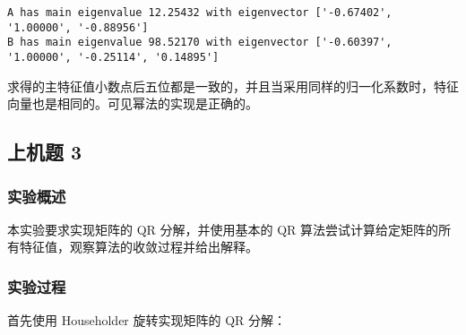 \documentclass[11pt]{ctexart}
\begin{document}
    \begin{Verbatim}[commandchars=\\\{\}]
A has main eigenvalue 12.25432 with eigenvector ['-0.67402', '1.00000', '-0.88956']
B has main eigenvalue 98.52170 with eigenvector ['-0.60397', '1.00000', '-0.25114', '0.14895']

    \end{Verbatim}

    求得的主特征值小数点后五位都是一致的，并且当采用同样的归一化系数时，特征向量也是相同的。可见幂法的实现是正确的。

    \subsection{上机题 3}\label{ux4e0aux673aux9898-3}

\subsubsection{实验概述}\label{ux5b9eux9a8cux6982ux8ff0}

本实验要求实现矩阵的 QR 分解，并使用基本的 QR
算法尝试计算给定矩阵的所有特征值，观察算法的收敛过程并给出解释。

\subsubsection{实验过程}\label{ux5b9eux9a8cux8fc7ux7a0b}

首先使用 Householder 旋转实现矩阵的 QR 分解：
\end{document}
